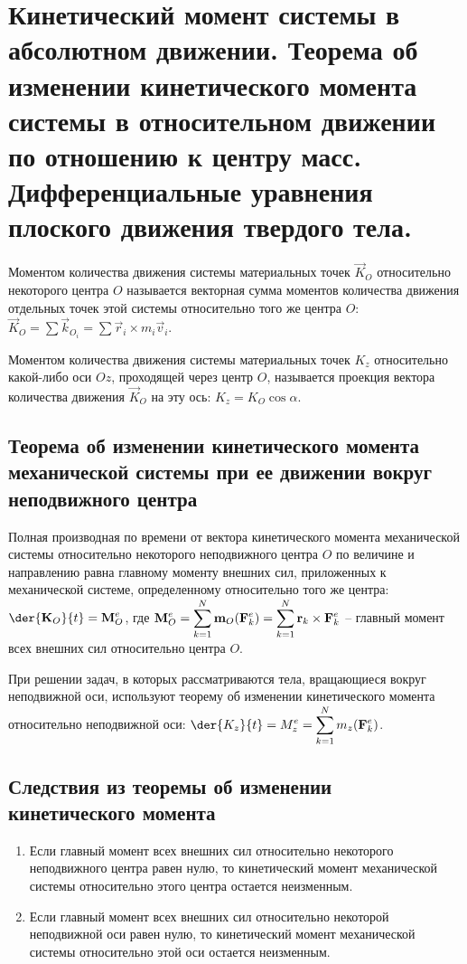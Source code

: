 \chapter{Кинетический момент системы в абсолютном движении. Теорема об
изменении кинетического момента системы в относительном движении по
отношению к центру масс. Дифференциальные уравнения плоского движения
твердого тела.}

Моментом количества движения системы материальных точек \( \vec{K}_O \)
относительно некоторого центра \( O \) называется векторная сумма моментов
количества движения отдельных точек этой системы относительно того же центра \( O \):
\( \vec{K}_O = \sum \vec{k}_{O_i} = \sum \vec{r}_i\times m_i\vec{v}_i \).
 
Моментом количества движения системы материальных точек \( K_z \) относительно
какой-либо оси \( Oz \), проходящей через центр \( O \), называется проекция
вектора количества движения \( \vec{K}_O \) на эту ось: \( K_z = K_O\cos\alpha \).

\section{Теорема об изменении кинетического момента механической системы при ее
движении вокруг неподвижного центра}
Полная производная по времени от вектора кинетического момента механической
системы относительно некоторого неподвижного центра \( O \) по величине и
направлению равна главному моменту внешних сил, приложенных к механической
системе, определенному относительно того же центра:
\( \ds \der{\vec{K}_O}{t} = \vec{M}^e_O \), 
где \( \displaystyle \mathbf{M}^e_O = \sum_{k=1}^N \mathbf{m}_O(\mathbf{F}^e_k) =
\sum_{k=1}^N \mathbf{r}_k\times\mathbf{F}^e_k \) -- главный момент всех внешних сил
относительно центра \( O \).

При  решении  задач, в которых рассматриваются тела, вращающиеся вокруг
неподвижной оси, используют теорему об изменении кинетического момента
относительно неподвижной оси:
\( \ds \der{K_z}{t} = M^e_z = \sum_{k=1}^N m_z(\vec{F}^e_k) \).
 
\section{Следствия из теоремы об изменении кинетического момента}
\begin{enumerate}
    \item Если главный момент всех внешних сил относительно некоторого
    неподвижного центра равен нулю, то кинетический момент механической системы
    относительно этого центра остается неизменным.
    \item Если главный момент всех внешних сил относительно некоторой
    неподвижной оси равен нулю, то кинетический момент механической системы
    относительно этой оси остается неизменным.
\end{enumerate}

